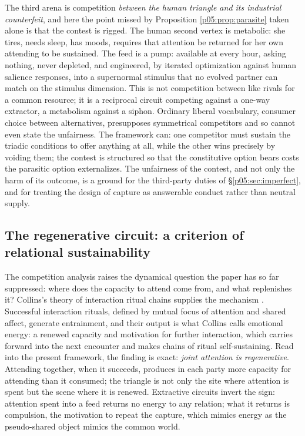 \documentclass[11pt,a4paper]{article}
\theoremstyle{seriesthm}
\begin{document}
The third arena is competition \emph{between the human triangle and its industrial counterfeit}, and here the point missed by Proposition \ref{p05:prop:parasite} taken alone is that the contest is rigged. The human second vertex is metabolic: she tires, needs sleep, has moods, requires that attention be returned for her own attending to be sustained. The feed is a pump: available at every hour, asking nothing, never depleted, and engineered, by iterated optimization against human salience responses, into a supernormal stimulus that no evolved partner can match on the stimulus dimension. This is not competition between like rivals for a common resource; it is a reciprocal circuit competing against a one-way extractor, a metabolism against a siphon. Ordinary liberal vocabulary, consumer choice between alternatives, presupposes symmetrical competitors and so cannot even state the unfairness. The framework can: one competitor must sustain the triadic conditions to offer anything at all, while the other wins precisely by voiding them; the contest is structured so that the constitutive option bears costs the parasitic option externalizes. The unfairness of the contest, and not only the harm of its outcome, is a ground for the third-party duties of §\ref{p05:sec:imperfect}, and for treating the design of capture as answerable conduct rather than neutral supply.

\subsection{The regenerative circuit: a criterion of relational sustainability}
\label{p05:sec:regeneration}

The competition analysis raises the dynamical question the paper has so far suppressed: where does the capacity to attend come from, and what replenishes it? Collins's theory of interaction ritual chains supplies the mechanism \parencite{collins2004}. Successful interaction rituals, defined by mutual focus of attention and shared affect, generate entrainment, and their output is what Collins calls emotional energy: a renewed capacity and motivation for further interaction, which carries forward into the next encounter and makes chains of ritual self-sustaining. Read into the present framework, the finding is exact: \emph{joint attention is regenerative}. Attending together, when it succeeds, produces in each party more capacity for attending than it consumed; the triangle is not only the site where attention is spent but the scene where it is renewed. Extractive circuits invert the sign: attention spent into a feed returns no energy to any relation; what it returns is compulsion, the motivation to repeat the capture, which mimics energy as the pseudo-shared object mimics the common world.
\end{document}
